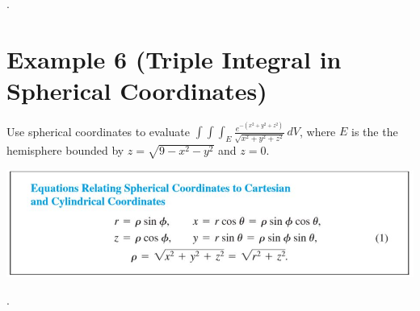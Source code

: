 \documentclass[11pt]{article}
\begin{document}
\newpage

. 

\newpage

\section*{Example 6 (Triple Integral in Spherical Coordinates)}

Use spherical coordinates to evaluate $\int\int\int_E \frac{e^{-(x^2+y^2+z^2)}}{\sqrt{x^2+y^2+z^2}} \, dV$, where $E$ is the the hemisphere bounded by $z = \sqrt{9 - x^2 - y^2}$ and $z = 0$.

\includegraphics{Capture11.jpg}

\newpage

.

\newpage
\end{document}
